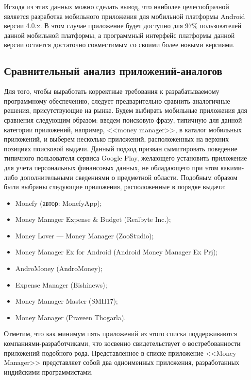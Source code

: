 Исходя из этих данных можно сделать вывод, что наиболее целесообразной
является разработка мобильного приложения для мобильной платформы
Android версии 4.0.x.
В этом случае приложение будет доступно для 97\% пользователей
данной мобильной платформы, а программный интерфейс платформы данной версии
остается достаточно совместимым со своими более новыми версиями.

\subsection{Сравнительный анализ приложений-аналогов}
\label{subsec:spec_compare}

Для того, чтобы выработать корректные требования к разрабатываемому
программному обеспечению, следует предварительно сравнить
аналогичные решения, присутствующие на рынке.
Будем выбирать мобильные приложения для сравнения следующим образом:
введем поисковую фразу, типичную для данной категории приложений,
например, <<money manager>>, в каталог мобильных приложений,
и выберем несколько приложений, расположенных на верхних позициях
поисковой выдачи.
Данный подход призван сымитировать поведение типичного пользователя
сервиса Google Play, желающего установить приложение для учета
персональных финансовых данных, не обладающего при этом какими-либо
дополнительными сведениями о предметной области.
Подобным образом были выбраны следующие приложения,
расположенные в порядке выдачи:
\begin{itemize}
\item Monefy (автор: MonefyApp);
\item Money Manager Expense \& Budget (Realbyte Inc.);
\item Money Lover --- Money Manager (ZooStudio);
\item Money Manager Ex for Android (Android Money Manager Ex Prj);
\item AndroMoney (AndroMoney);
\item Expense Manager (Bishinews);
\item Money Manager Master (SMH17);
\item Money Manager (Praveen Thogarla).
\end{itemize}

Отметим, что как минимум пять приложений из этого списка поддерживаются
компаниями-разработчиками, что косвенно свидетельствует о востребованности
приложений подобного рода.
Представленное в списке приложение <<Money Manager>> представляет собой
два одноименных приложения, разработанных индийскими программистами.

